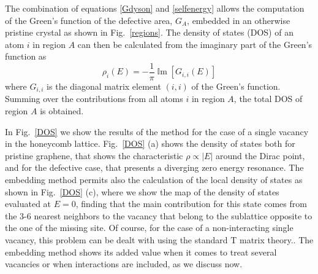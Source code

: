\documentclass[aps,prb,twocolumn,superscriptaddress]{revtex4-1}
\renewcommand{\Im}[1]{\operatorname{\mathbb{I}m}\left[#1\right]}
\begin{document}
The combination of equations \eqref{Gdyson} and \eqref{selfenergy} allows the computation of the Green's function of the defective area, $G_A$, embedded in an otherwise pristine crystal as shown in Fig.~\ref{regions}. The density of states (DOS) of an atom $i$ in region $A$ can then be calculated from the imaginary part of the Green's function as
\begin{equation}
  \rho_{i}(E) = -\frac{1}{\pi}\Im{G_{i,i}(E)}
  \label{eq:DOS}
\end{equation}
where $G_{i,i}$ is the diagonal matrix element $(i,i)$ of the Green's function. Summing over the contributions from all atoms $i$ in region $A$, the total DOS of region $A$ is obtained.

In Fig.~\ref{DOS} we show the results of the method for the case of a single vacancy in the honeycomb lattice. Fig.~\ref{DOS} (a) shows the density of states both for pristine graphene, that shows the characteristic $\rho \propto |E|$ around the Dirac point,\cite{Katsnelson2012} and for the defective case, that presents a diverging zero energy resonance. The embedding method permits also the calculation of the local density of states as shown in Fig.~\ref{DOS} (c), where we show the map of the density of states evaluated at $E=0$, finding that the main contribution for this state comes from the 3-6 nearest neighbors to the vacancy that belong to the sublattice opposite to the one of the missing site.\cite{Pereira2006,kumazaki2007,Wehling2007,Pereira2008,Palacios2008}
Of course, for the case of a non-interacting single vacancy, this problem can be dealt with using the standard T matrix theory.\cite{libro-Economou,Gonzalez2012,Wehling2007}. The embedding method shows its added value when it comes to treat several vacancies or when interactions are included, as we discuss now.
\end{document}
